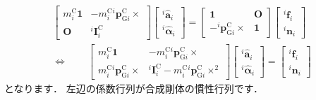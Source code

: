 \documentclass{jsarticle}
\begin{document}
\begin{align*}
\left[\begin{array}{cc}
m_{i}^{\mathrm{C}}\bm{1} & -m_{i}^{\mathrm{C}}{}^{i}\bm{p}_{\mathrm{G}i}^{\mathrm{C}}\times \\
\bm{O} & {}^{i}\bm{I}_{i}^{\mathrm{C}}
\end{array}\right]
\left[\begin{array}{c}
{}^{i}\hat{\bm{a}}_{i}
\\
{}^{i}\hat{\bm{\alpha}}_{i}
\end{array}\right]
=
\left[\begin{array}{cc}
\bm{1} & \bm{O} \\
-{}^{i}\bm{p}_{\mathrm{G}i}^{\mathrm{C}}\times & \bm{1}
\end{array}\right]
\left[\begin{array}{c}
{}^{i}\bm{f}_{i}
\\
{}^{i}\bm{n}_{i}
\end{array}\right]
\\
\Leftrightarrow\qquad
\left[\begin{array}{cc}
m_{i}^{\mathrm{C}}\bm{1} & -m_{i}^{\mathrm{C}}{}^{i}\bm{p}_{\mathrm{G}i}^{\mathrm{C}}\times \\
m_{i}^{\mathrm{C}}{}^{i}\bm{p}_{\mathrm{G}i}^{\mathrm{C}}\times & {}^{i}\bm{I}_{i}^{\mathrm{C}}-m_{i}^{\mathrm{C}}{}^{i}\bm{p}_{\mathrm{G}i}^{\mathrm{C}}\times^{2}
\end{array}\right]
\left[\begin{array}{c}
{}^{i}\hat{\bm{a}}_{i}
\\
{}^{i}\hat{\bm{\alpha}}_{i}
\end{array}\right]
=
\left[\begin{array}{c}
{}^{i}\bm{f}_{i}
\\
{}^{i}\bm{n}_{i}
\end{array}\right]
\end{align*}
となります．
左辺の係数行列が合成剛体の慣性行列です．
\end{document}
